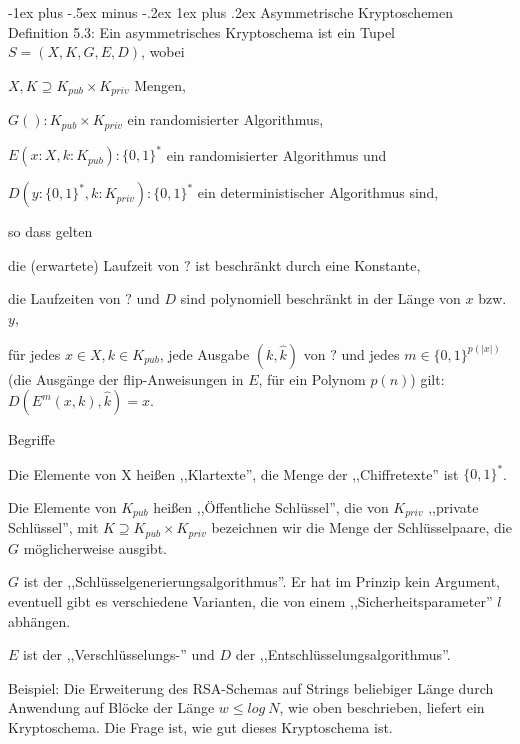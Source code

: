 \documentclass[a4paper]{article}
\makeatletter
\renewcommand{\subsubsection}{\@startsection{subsubsection}{3}{0mm}%
 {-1ex plus -.5ex minus -.2ex}%
 {1ex plus .2ex}%
 {\normalfont\small\bfseries}}
\makeatother
\begin{document}
\begin{multicols}{3}
        \subsubsection{Asymmetrische Kryptoschemen}
        Definition 5.3: Ein asymmetrisches Kryptoschema ist ein Tupel $S= (X,K,G,E,D)$, wobei
        \begin{itemize*}
            \item $X,K\supseteq K_{pub} \times K_{priv}$ Mengen,
            \item  $G():K_{pub} \times K_{priv}$ ein randomisierter Algorithmus,
            \item  $E(x:X,k:K_{pub}):\{0,1\}^*$ ein randomisierter Algorithmus und
            \item  $D(y:\{0,1\}^*,k:K_{priv}):\{0,1\}^*$ ein deterministischer Algorithmus sind,
            \item so dass gelten
            \item die (erwartete) Laufzeit von $?$ ist beschränkt durch eine Konstante,
            \item die Laufzeiten von $?$ und $D$ sind polynomiell beschränkt in der Länge von $x$ bzw. $y$,
            \item für jedes $x\in X,k\in K_{pub}$, jede Ausgabe $(k,\hat{k})$ von $?$ und jedes $m\in\{0,1\}^{p(|x|)}$ (die Ausgänge der flip-Anweisungen in $E$, für ein Polynom $p(n)$) gilt: $D(E^m (x,k), \hat{k}) =x$.
        \end{itemize*}

        Begriffe
        \begin{itemize*}
            \item Die Elemente von X heißen ,,Klartexte'', die Menge der ,,Chiffretexte'' ist $\{0,1\}^*$.
            \item Die Elemente von $K_{pub}$ heißen ,,Öffentliche Schlüssel'', die von $K_{priv}$ ,,private Schlüssel'', mit $K\supseteq K_{pub} \times K_{priv}$ bezeichnen wir die Menge der Schlüsselpaare, die $G$ möglicherweise ausgibt.
            \item $G$ ist der ,,Schlüsselgenerierungsalgorithmus''. Er hat im Prinzip kein Argument, eventuell gibt es verschiedene Varianten, die von einem ,,Sicherheitsparameter'' $l$ abhängen.
            \item $E$ ist der ,,Verschlüsselungs-'' und $D$ der ,,Entschlüsselungsalgorithmus''.
        \end{itemize*}

        Beispiel: Die Erweiterung des RSA-Schemas auf Strings beliebiger Länge durch Anwendung auf Blöcke der Länge $w\leq log\ N$, wie oben beschrieben, liefert ein Kryptoschema. Die Frage ist, wie gut dieses Kryptoschema ist.


\end{multicols}
\end{document}
